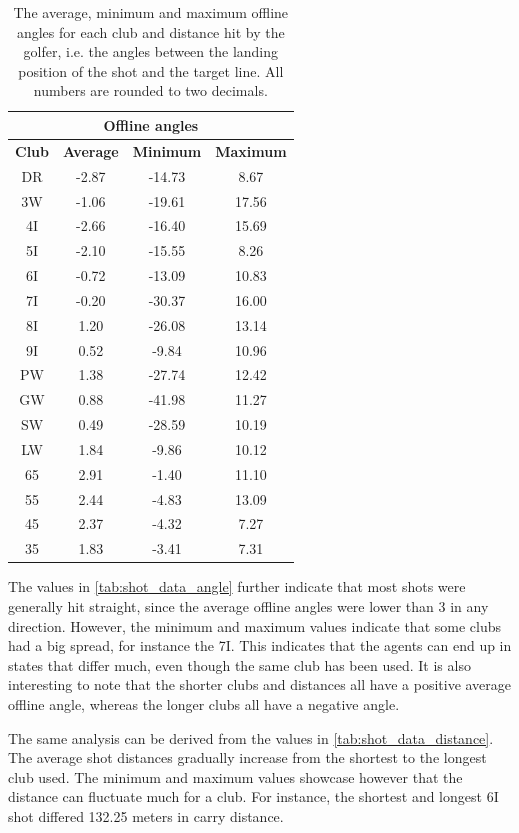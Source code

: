 \documentclass{kththesis}
\begin{document}
\begin{table}
\centering
\begin{tabular}{|c|c|c|c|} \hline
\multicolumn{4}{|c|}{\textbf{Offline angles}} \\ \hline
\textbf{Club} & \textbf{Average} & \textbf{Minimum} & \textbf{Maximum} \\ \hline
DR & -2.87 & -14.73 & 8.67 \\ \hline
3W & -1.06 & -19.61 & 17.56 \\ \hline
4I & -2.66 & -16.40 & 15.69 \\ \hline
5I & -2.10 & -15.55 & 8.26 \\ \hline
6I & -0.72 & -13.09 & 10.83 \\ \hline
7I & -0.20 & -30.37 & 16.00 \\ \hline
8I & 1.20 & -26.08 & 13.14 \\ \hline
9I & 0.52 & -9.84 & 10.96 \\ \hline
PW & 1.38 & -27.74 & 12.42 \\ \hline
GW & 0.88 & -41.98 & 11.27 \\ \hline
SW & 0.49 & -28.59 & 10.19 \\ \hline
LW & 1.84 & -9.86 & 10.12 \\ \hline
65 & 2.91 & -1.40 & 11.10 \\ \hline
55 & 2.44 & -4.83 & 13.09 \\ \hline
45 & 2.37 & -4.32 & 7.27 \\ \hline
35 & 1.83 & -3.41 & 7.31 \\ \hline
\end{tabular}
\caption{The average, minimum and maximum offline angles for each club and distance hit by the golfer, i.e. the angles between the landing position of the shot and the target line. All numbers are rounded to two decimals.}
\label{tab:shot_data_angle}
\end{table}

The values in \autoref{tab:shot_data_angle} further indicate that most shots were generally hit straight, since the average offline angles were lower than 3 in any direction. However, the minimum and maximum values indicate that some clubs had a big spread, for instance the 7I. This indicates that the agents can end up in states that differ much, even though the same club has been used. It is also interesting to note that the shorter clubs and distances all have a positive average offline angle, whereas the longer clubs all have a negative angle.

The same analysis can be derived from the values in \autoref{tab:shot_data_distance}. The average shot distances gradually increase from the shortest to the longest club used. The minimum and maximum values showcase however that the distance can fluctuate much for a club. For instance, the shortest and longest 6I shot differed 132.25 meters in carry distance. 
\end{document}
